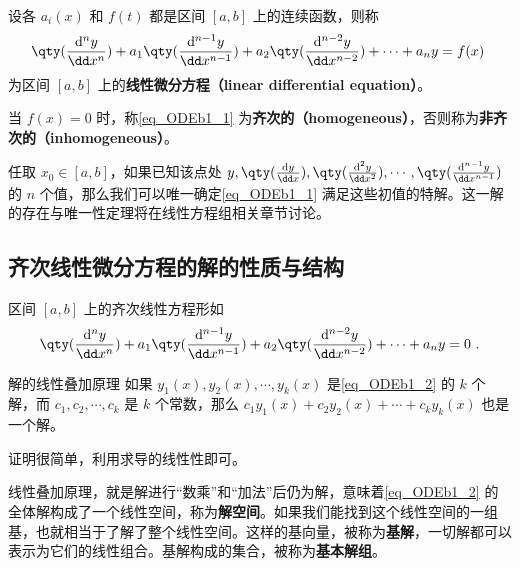 

\begin{definition}{}
设各 $a_i(x)$ 和 $f(t)$ 都是区间 $[a, b]$ 上的连续函数，则称
\begin{equation}\label{eq_ODEb1_1}
\qty(\frac{\mathrm{d}^n y}{\dd x^n})+a_1\qty(\frac{\mathrm{d}^{n-1} y}{\dd x^{n-1}})+a_2\qty(\frac{\mathrm{d}^{n-2} y}{\dd x^{n-2}})+\cdots+a_ny=f(x)~
\end{equation}
为区间 $[a, b]$ 上的\textbf{线性微分方程（linear differential equation）}。

当 $f(x)=0$ 时，称\autoref{eq_ODEb1_1} 为\textbf{齐次的（homogeneous）}，否则称为\textbf{非齐次的（inhomogeneous）}。
\end{definition}

任取 $x_0\in[a, b]$，如果已知该点处 $y, \qty(\frac{\mathrm{d} y}{\dd x}), \qty(\frac{\mathrm{d}^{2} y}{\dd x^{2}}), \cdots, \qty(\frac{\mathrm{d}^{n-1} y}{\dd x^{n-1}})$ 的 $n$ 个值，那么我们可以唯一确定\autoref{eq_ODEb1_1} 满足这些初值的特解。这一解的存在与唯一性定理将在线性方程组相关章节讨论。


\subsection{齐次线性微分方程的解的性质与结构}

区间 $[a, b]$ 上的齐次线性方程形如
\begin{equation}\label{eq_ODEb1_2}
\qty(\frac{\mathrm{d}^n y}{\dd x^n})+a_1\qty(\frac{\mathrm{d}^{n-1} y}{\dd x^{n-1}})+a_2\qty(\frac{\mathrm{d}^{n-2} y}{\dd x^{n-2}})+\cdots+a_ny=0~.
\end{equation}

\begin{theorem}{解的线性叠加原理}
如果 $y_1(x), y_2(x), \cdots, y_k(x)$ 是\autoref{eq_ODEb1_2} 的 $k$ 个解，而 $c_1, c_2, \cdots, c_k$ 是 $k$ 个常数，那么 $c_1y_1(x)+c_2y_2(x)+\cdots+c_ky_k(x)$ 也是一个解。
\end{theorem}

证明很简单，利用求导的线性性即可。

线性叠加原理，就是解进行“数乘”和“加法”后仍为解，意味着\autoref{eq_ODEb1_2} 的全体解构成了一个线性空间，称为\textbf{解空间}。如果我们能找到这个线性空间的一组基，也就相当于了解了整个线性空间。这样的基向量，被称为\textbf{基解}，一切解都可以表示为它们的线性组合。基解构成的集合，被称为\textbf{基本解组}。


